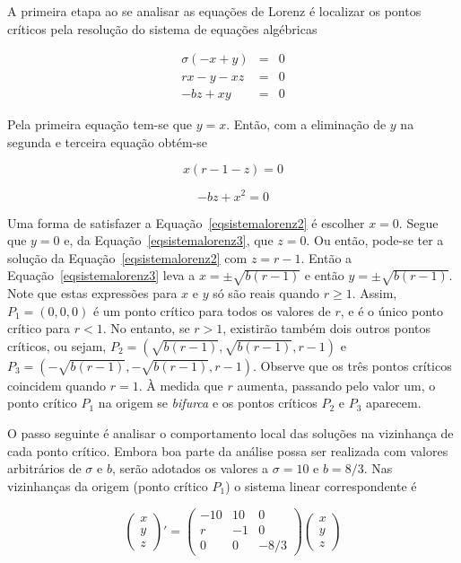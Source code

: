 A primeira etapa ao se analisar as equações de Lorenz é localizar os pontos críticos pela resolução do sistema de equações algébricas

\begin{equation}
\begin{array}{ccc} \sigma(-x+y) & = & 0 \\ rx-y-xz & = & 0 \\ -bz+xy & = & 0 \end{array}
\label{eqsistemalorenz1}
\end{equation}

Pela primeira equação tem-se que $y=x$. Então, com a eliminação de $y$ na segunda e terceira equação obtém-se

\begin{equation}
x(r-1-z)=0
\label{eqsistemalorenz2}
\end{equation}

\begin{equation}
-bz+x^2=0
\label{eqsistemalorenz3}
\end{equation}

Uma forma de satisfazer a Equação~\ref{eqsistemalorenz2} é escolher $x=0$. Segue que $y=0$ e, da Equação~\ref{eqsistemalorenz3}, que $z=0$. Ou então, pode-se ter a solução da Equação~\ref{eqsistemalorenz2} com $z=r-1$. Então a Equação~\ref{eqsistemalorenz3} leva a $x=\pm\sqrt{b(r-1)}$ e então $y=\pm\sqrt{b(r-1)}$. Note que estas expressões para $x$ e $y$ só são reais quando $r\geq1$. Assim, $P_{1}=(0,0,0)$ é um ponto crítico para todos os valores de $r$, e é o único ponto crítico para $r<1$. No entanto, se $r>1$, existirão também dois outros pontos críticos, ou sejam, $P_{2}=(\sqrt{b(r-1)},\sqrt{b(r-1)},r-1)$ e $P_{3}=(-\sqrt{b(r-1)},-\sqrt{b(r-1)},r-1)$. Observe que os três pontos críticos coincidem quando $r=1$. À medida que $r$ aumenta, passando pelo valor um, o ponto crítico $P_{1}$ na origem se \textit{bifurca} e os pontos críticos $P_{2}$ e $P_{3}$ aparecem.

O passo seguinte é analisar o comportamento local das soluções na vizinhança de cada ponto crítico. Embora boa parte da análise possa ser realizada com valores arbitrários de $\sigma$ e $b$, serão adotados os valores a $\sigma=10$ e $b=8/3$. Nas vizinhanças da origem (ponto crítico $P_{1}$) o sistema linear correspondente é

\begin{equation}
\left(\begin{array}{ccc}x \\ y \\ z \end{array}\right)'=
\left(\begin{array}{ccc}-10 & 10 & 0  \\ r & -1 & 0 \\ 0 & 0 & -8/3 \end{array}\right)
\left(\begin{array}{ccc}x \\ y \\ z \end{array}\right)
\label{eqsistemalinearizado}
\end{equation}

